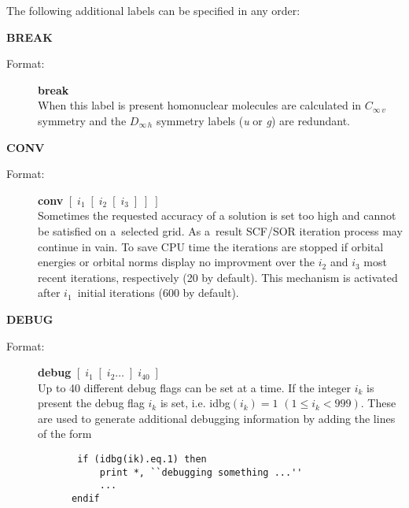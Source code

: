 \documentclass[12pt,a4paper]{article}
\newcommand{\ft}[1]{\texttt{#1}}
\begin{document}
The following additional labels can be specified in any order:
\begin{description}


\item \textbf{BREAK} 
\begin{description} 
\item[Format:] \textbf{break} \\ When this label is present homonuclear molecules are
  calculated in $C_{\infty\,v}$ symmetry and the $D_{\infty\,h}$ symmetry labels ({\it u}
  or {\it g}) are redundant.

\end{description} 


\item \textbf{CONV}
\begin{description} 
\item[Format:] \textbf{conv} $[\;i_1\;[\;i_2\;[\;i_3\;]\;]\;]$\\ Sometimes the requested
  accuracy of a solution is set too high and cannot be satisfied on a~selected grid. As
  a~result SCF/SOR iteration process may continue in vain. To save CPU time the iterations
  are stopped if orbital energies or orbital norms display no improvment over the $i_2$
  and $i_3$ most recent iterations, respectively (20 by default). This mechanism is
  activated after $i_1$~initial iterations (600 by default).
\end{description}  

\item \textbf{DEBUG} 
\begin{description} 
\item[Format:] \textbf{debug} $[\; i_1 \; [\;i_2 \ldots \;] \;i_{40}\;]$ \\ 
  Up to 40 different debug flags can be set at a time.
  If the integer $i_k$ is present the debug flag $i_k$ is set, i.e. idbg$(i_k)=1$ $(1 \leq
  i_k<999)$. These are used to generate additional debugging information by adding the
  lines of the form
  \begin{verbatim} 
       if (idbg(ik).eq.1) then
           print *, ``debugging something ...''
           ...
      endif
    \end{verbatim} 
\end{description} 



\end{description}
\end{document}
